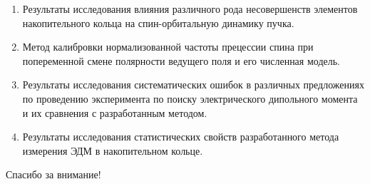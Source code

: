 \documentclass[14pt]{beamer}
\begin{document}
\begin{frame}
	\begin{enumerate}
		\item Результаты исследования влияния различного рода несовершенств элементов накопительного кольца 
		на спин-орбитальную динамику пучка. 
		\item Метод калибровки нормализованной частоты прецессии спина при попеременной смене полярности ведущего поля и его численная модель.
		\item Результаты исследования систематических ошибок в различных предложениях по проведению эксперимента по поиску электрического дипольного момента и их сравнения с разработанным методом. 
		\item Результаты исследования статистических свойств разработанного метода измерения ЭДМ	в накопительном кольце.
	\end{enumerate}
\end{frame}

\begin{frame}
\begin{center}
Спасибо за внимание!
\end{center}
\end{frame}
\end{document}
